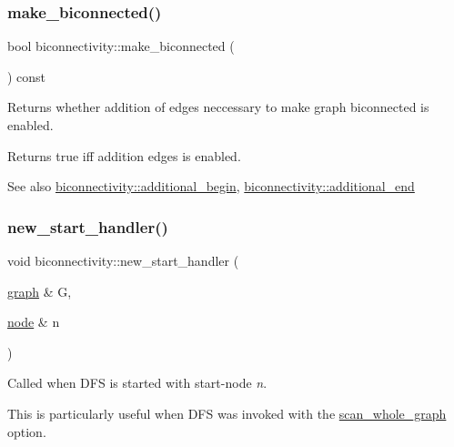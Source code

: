 \subsubsection{\texorpdfstring{make\+\_\+biconnected()}{make\_biconnected()}\hspace{0.1cm}{\footnotesize\ttfamily [2/2]}}
{\footnotesize\ttfamily bool biconnectivity\+::make\+\_\+biconnected (\begin{DoxyParamCaption}{ }\end{DoxyParamCaption}) const\hspace{0.3cm}{\ttfamily [inline]}}



Returns whether addition of edges neccessary to make graph biconnected is enabled. 

\begin{DoxyReturn}{Returns}
true iff addition edges is enabled. 
\end{DoxyReturn}
\begin{DoxySeeAlso}{See also}
\mbox{\hyperlink{classbiconnectivity_ac5295da180114bffbbfd621d644d4c58}{biconnectivity\+::additional\+\_\+begin}}, \mbox{\hyperlink{classbiconnectivity_a447a86f387efd181b25b8bacf3365e75}{biconnectivity\+::additional\+\_\+end}} 
\end{DoxySeeAlso}
\mbox{\label{classbiconnectivity_ae94213830755f1f4d477ec6bff0f25b8}} 
\subsubsection{\texorpdfstring{new\+\_\+start\+\_\+handler()}{new\_start\_handler()}}
{\footnotesize\ttfamily void biconnectivity\+::new\+\_\+start\+\_\+handler (\begin{DoxyParamCaption}\item[{\mbox{\hyperlink{classgraph}{graph}} \&}]{G,  }\item[{\mbox{\hyperlink{classnode}{node}} \&}]{n }\end{DoxyParamCaption})\hspace{0.3cm}{\ttfamily [virtual]}}



Called when D\+FS is started with start-\/node {\itshape n}. 

This is particularly useful when D\+FS was invoked with the \mbox{\hyperlink{classdfs_aa7c864a6f3a120720138b187b3ed95b5}{scan\+\_\+whole\+\_\+graph}} option.


